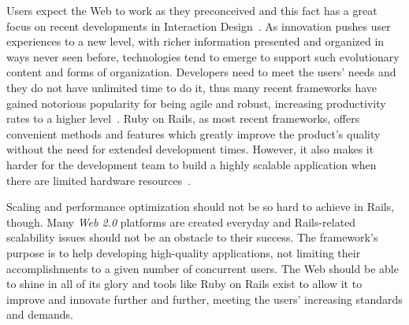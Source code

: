 Users expect the Web to work as they preconceived and this fact has a great focus on recent developments in Interaction Design~\cite{interaction_design}. As innovation pushes user experiences to a new level, with richer information presented and organized in ways never seen before, technologies tend to emerge to support such evolutionary content and forms of organization. Developers need to meet the users' needs and they do not have unlimited time to do it, thus many recent frameworks have gained notorious popularity for being agile and robust, increasing productivity rates to a higher level~\cite{trends_webdev}. Ruby on Rails, as most recent frameworks, offers convenient methods and features which greatly improve the product's quality without the need for extended development times. However, it also makes it harder for the development team to build a highly scalable application when there are limited hardware resources~\cite{look_common_performance_problems_rails}.

Scaling and performance optimization should not be so hard to achieve in Rails, though. Many \textit{Web 2.0} platforms are created everyday and Rails-related scalability issues should not be an obstacle to their success. The framework's purpose is to help developing high-quality applications, not limiting their accomplishments to a given number of concurrent users. The Web should be able to shine in all of its glory and tools like Ruby on Rails exist to allow it to improve and innovate further and further, meeting the users' increasing standards and demands.

